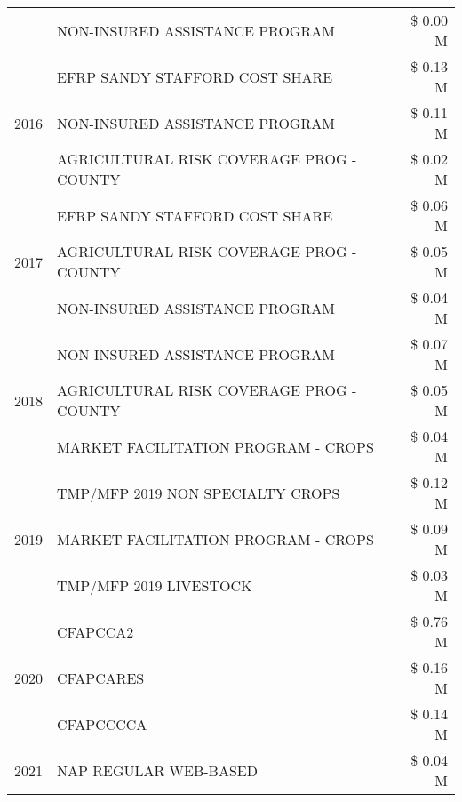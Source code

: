 \begin{tabular}{llr}
 & NON-INSURED ASSISTANCE PROGRAM & \$ 0.00 M \\
\cline{1-3}
\multirow[t]{3}{*}{2016} & EFRP SANDY STAFFORD COST SHARE & \$ 0.13 M \\
 & NON-INSURED ASSISTANCE PROGRAM & \$ 0.11 M \\
 & AGRICULTURAL RISK COVERAGE PROG - COUNTY & \$ 0.02 M \\
\cline{1-3}
\multirow[t]{3}{*}{2017} & EFRP SANDY STAFFORD COST SHARE & \$ 0.06 M \\
 & AGRICULTURAL RISK COVERAGE PROG - COUNTY & \$ 0.05 M \\
 & NON-INSURED ASSISTANCE PROGRAM & \$ 0.04 M \\
\cline{1-3}
\multirow[t]{3}{*}{2018} & NON-INSURED ASSISTANCE PROGRAM & \$ 0.07 M \\
 & AGRICULTURAL RISK COVERAGE PROG - COUNTY & \$ 0.05 M \\
 & MARKET FACILITATION PROGRAM - CROPS & \$ 0.04 M \\
\cline{1-3}
\multirow[t]{3}{*}{2019} & TMP/MFP 2019 NON SPECIALTY CROPS & \$ 0.12 M \\
 & MARKET FACILITATION PROGRAM - CROPS & \$ 0.09 M \\
 & TMP/MFP 2019 LIVESTOCK & \$ 0.03 M \\
\cline{1-3}
\multirow[t]{3}{*}{2020} & CFAPCCA2 & \$ 0.76 M \\
 & CFAPCARES & \$ 0.16 M \\
 & CFAPCCCCA & \$ 0.14 M \\
\cline{1-3}
2021 & NAP REGULAR WEB-BASED & \$ 0.04 M \\
\cline{1-3}
\bottomrule
\end{tabular}
